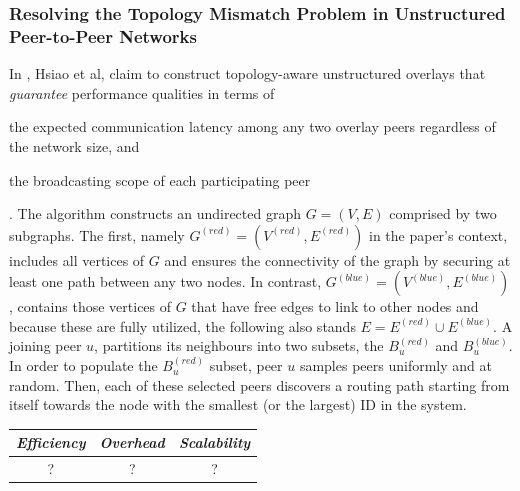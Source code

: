 \subsubsection{Resolving the Topology Mismatch Problem in Unstructured
Peer-to-Peer Networks}

In \cite{hsiao_redblue_2009}, Hsiao et al, claim to construct topology-aware
unstructured overlays that \emph{guarantee} performance qualities in terms of
\begin{inparaenum}
  \item the expected communication latency among any two overlay peers
regardless of the network size, and
  \item the broadcasting scope of each participating peer
\end{inparaenum}
. The algorithm constructs an undirected graph $G = \left( V, E \right)$
comprised by two subgraphs. The first, namely $G^{\left( red \right)} = \left(
V^{\left( red \right)}, E^{\left( red \right)} \right)$ in the paper's context,
includes all vertices of $G$ and ensures the connectivity of the graph by
securing at least one path between any two nodes. In contrast, $G^{\left( blue
\right)} = \left( V^{\left( blue \right)}, E^{\left( blue \right)} \right)$,
contains those vertices of $G$ that have free edges to link to other nodes and
because these are fully utilized, the following also stands $E = E^{\left( red
\right)} \cup E^{\left( blue \right)}$. A joining peer $u$, partitions its
neighbours into two subsets, the $B_u^{\left( red \right)}$ and $B_u^{\left(
blue \right)}$. In order to populate the $B_u^{\left( red \right)}$ subset, peer
$u$ samples peers uniformly and at random. Then, each of these selected peers
discovers a routing path starting from itself towards the node with the smallest
(or the largest) ID in the system.

\begin{center}
\begin{tabular}{ccc}
\emph{Efficiency} & \emph{Overhead} & \emph{Scalability} \\
\hline
%
? &
%
? &
%
?
\end{tabular}
\end{center}

